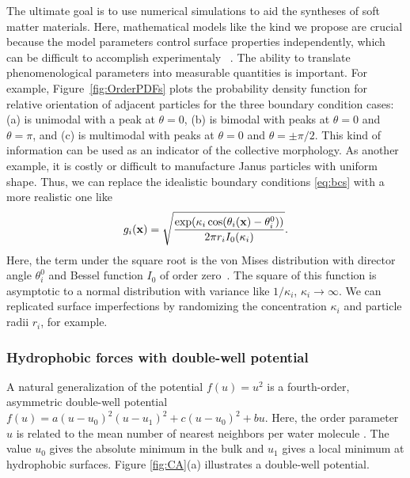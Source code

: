 The ultimate goal is to use numerical simulations to aid
the syntheses of soft matter materials.
Here, mathematical models like the kind we propose are crucial
because the model parameters control surface properties independently, 
which can be difficult to accomplish experimentaly 
~\cite{Bradley2016,Mallory2017,Bradley2017}.
The ability to translate phenomenological parameters
into measurable quantities is important. 
For example, Figure~\ref{fig:OrderPDFs} plots
the probability density function for 
relative orientation of adjacent particles
for the three boundary condition cases:
(a) is unimodal with a peak at $\theta = 0$,
(b) is bimodal with peaks at $\theta = 0$ and $\theta = \pi$,
and (c) is multimodal with peaks at $\theta = 0$ and $\theta = \pm \pi/2$.
This kind of information can be used as an indicator
of the collective morphology. As another example,
it is costly or difficult to manufacture
Janus particles with uniform shape.
Thus, we can replace the idealistic boundary
conditions \eqref{eq:bcs} with a more realistic one like
\begin{equation}
\label{eq:vonMises}
  g_i(\mathbf{x}) = \sqrt{
  \frac{\exp( \kappa_i\cos(\theta_i(\mathbf{x}) - \theta^0_i))}
  {2\pi r_i I_0(\kappa_i)}}.
\end{equation}
Here, the term under the square root is the von Mises distribution with
director angle $\theta^0_i$ and Bessel function $I_0$ of order zero~\cite{Fisher_1993}.
The square of this function is asymptotic to a normal distribution with variance
like $1/\kappa_i$, $\kappa_i \to \infty$. We can replicated surface imperfections
by randomizing the concentration $\kappa_i$ and particle radii $r_i$,
for example.

\subsubsection{Hydrophobic forces with double-well potential}
A natural generalization of the potential $f(u) = u^2$
is a fourth-order, asymmetric double-well potential
$f(u) = a(u-u_0)^2(u-u_1)^2 + c(u-u_0)^2 + bu$.
Here, the order parameter $u$ is related to
the mean number of nearest neighbors
per water molecule \cite{GoHaKo94}.
The value $u_0$ gives the absolute minimum in the bulk
and $u_1$ gives a local minimum at hydrophobic surfaces.
Figure \ref{fig:CA}(a) illustrates a double-well potential.


